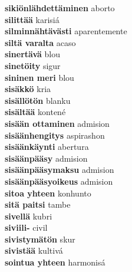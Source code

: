 \textbf{ sikiönlähdettäminen  } aborto \\
\textbf{ silittää  } karisiá \\
\textbf{ silminnähtävästi  } aparentemente \\
\textbf{ siltä varalta  } acaso \\
\textbf{ sinertävä  } blou \\
\textbf{ sinetöity  } sigur \\
\textbf{ sininen meri  } blou \\
\textbf{ sisäkkö  } kria \\
\textbf{ sisällötön  } blanku \\
\textbf{ sisältää  } kontené \\
\textbf{ sisään ottaminen  } admision \\
\textbf{ sisäänhengitys  } aspirashon \\
\textbf{ sisäänkäynti  } abertura \\
\textbf{ sisäänpääsy  } admision \\
\textbf{ sisäänpääsymaksu  } admision \\
\textbf{ sisäänpääsyoikeus  } admision \\
\textbf{ sitoa yhteen  } konhunto \\
\textbf{ sitä paitsi  } tambe \\
\textbf{ sivellä  } kubri \\
\textbf{ siviili-  } civil \\
\textbf{ sivistymätön  } skur \\
\textbf{ sivistää  } kultivá \\
\textbf{ sointua yhteen  } harmonisá \\

